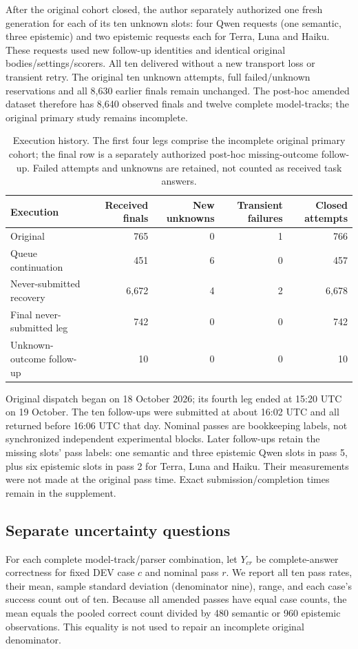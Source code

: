 \documentclass[a4paper,preprint,12pt,numbers,nopreprintline]{elsarticle}
\begin{document}
After the original cohort closed, the author separately authorized one fresh generation for each of its ten unknown slots: four Qwen requests (one semantic, three epistemic) and two epistemic requests each for Terra, Luna and Haiku. These requests used new follow-up identities and identical original bodies/settings/scorers. All ten delivered without a new transport loss or transient retry. The original ten unknown attempts, full failed/unknown reservations and all 8,630 earlier finals remain unchanged. The post-hoc amended dataset therefore has 8,640 observed finals and twelve complete model-tracks; the original primary study remains incomplete.
\begin{table}[htbp]\centering\scriptsize
\caption{Execution history. The first four legs comprise the incomplete original primary cohort; the final row is a separately authorized post-hoc missing-outcome follow-up. Failed attempts and unknowns are retained, not counted as received task answers.}\label{tab:execution}
\setlength{\tabcolsep}{3pt}
\begin{tabular}{lrrrr}\toprule
Execution & Received finals & New unknowns & Transient failures & Closed attempts\\\midrule
Original & 765 & 0 & 1 & 766\\
Queue continuation & 451 & 6 & 0 & 457\\
Never-submitted recovery & 6,672 & 4 & 2 & 6,678\\
Final never-submitted leg & 742 & 0 & 0 & 742\\
Unknown-outcome follow-up & 10 & 0 & 0 & 10\\
\bottomrule\end{tabular}
\end{table}

Original dispatch began on 18 October 2026; its fourth leg ended at 15:20 UTC on 19 October. The ten follow-ups were submitted at about 16:02 UTC and all returned before 16:06 UTC that day. Nominal passes are bookkeeping labels, not synchronized independent experimental blocks. Later follow-ups retain the missing slots' pass labels: one semantic and three epistemic Qwen slots in pass 5, plus six epistemic slots in pass 2 for Terra, Luna and Haiku. Their measurements were not made at the original pass time. Exact submission/completion times remain in the supplement.

\subsection{Separate uncertainty questions}
For each complete model-track/parser combination, let \(Y_{cr}\) be complete-answer correctness for fixed DEV case \(c\) and nominal pass \(r\). We report all ten pass rates, their mean, sample standard deviation (denominator nine), range, and each case's success count out of ten. Because all amended passes have equal case counts, the mean equals the pooled correct count divided by 480 semantic or 960 epistemic observations. This equality is not used to repair an incomplete original denominator.
\end{document}
